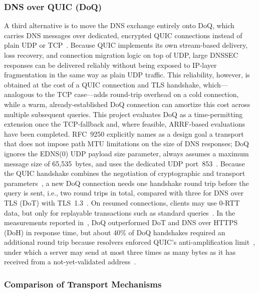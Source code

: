 \documentclass[conference]{IEEEtran}
\begin{document}
\subsubsection{DNS over QUIC (DoQ)}

A third alternative is to move the DNS exchange entirely onto DoQ, which
carries DNS messages over dedicated, encrypted QUIC connections instead of
plain UDP or TCP~\cite{rfc9250}. Because QUIC implements its own stream-based
delivery, loss recovery, and connection migration logic on top of UDP, large
DNSSEC responses can be delivered reliably without being exposed to IP-layer
fragmentation in the same way as plain UDP traffic. This reliability, however,
is obtained at the cost of a QUIC connection and TLS handshake, which---analogous
to the TCP case---adds round-trip overhead on a cold connection, while a warm,
already-established DoQ connection can amortize this cost across multiple
subsequent queries. This project evaluates DoQ as a time-permitting extension
once the TCP-fallback and, where feasible, ARRF-based evaluations have been
completed. RFC~9250 explicitly names as a design goal a transport that does not
impose path MTU limitations on the size of DNS responses; DoQ ignores the
EDNS(0) UDP payload size parameter, always assumes a maximum message size of
65,535~bytes, and uses the dedicated UDP port~853~\cite{rfc9250}. Because the
QUIC handshake combines the negotiation of cryptographic and transport
parameters~\cite{rfc9000}, a new DoQ connection needs one handshake round trip
before the query is sent, i.e., two round trips in total, compared with three
for DNS over TLS (DoT) with TLS~1.3~\cite{doqfirstlook}. On resumed
connections, clients may use 0-RTT data, but only for replayable transactions
such as standard queries~\cite{rfc9250}. In the measurements reported
in~\cite{doqfirstlook}, DoQ outperformed DoT and DNS over HTTPS (DoH) in
response time, but about 40\% of DoQ handshakes required an additional round
trip because resolvers enforced QUIC's anti-amplification
limit~\cite{doqfirstlook}, under which a server may send at most three times as
many bytes as it has received from a not-yet-validated
address~\cite{rfc9000}.

\subsubsection{Comparison of Transport Mechanisms}
\label{sec:comparison}
\end{document}
